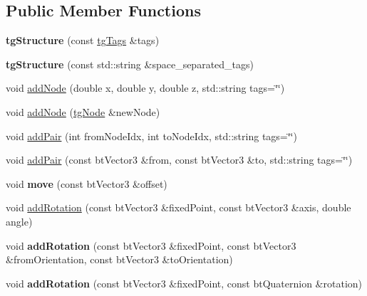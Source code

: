 \subsection*{Public Member Functions}
\begin{DoxyCompactItemize}
\item 
\hypertarget{classtg_structure_a0b858af864193396ab83a2231699c7dd}{{\bfseries tg\-Structure} (const \hyperlink{classtg_tags}{tg\-Tags} \&tags)}\label{classtg_structure_a0b858af864193396ab83a2231699c7dd}

\item 
\hypertarget{classtg_structure_a533f459391d9bc8e1bb772f5195a5458}{{\bfseries tg\-Structure} (const std\-::string \&space\-\_\-separated\-\_\-tags)}\label{classtg_structure_a533f459391d9bc8e1bb772f5195a5458}

\item 
void \hyperlink{classtg_structure_ad534cef2bcb869f03290a447a08507e2}{add\-Node} (double x, double y, double z, std\-::string tags=\char`\"{}\char`\"{})
\item 
void \hyperlink{classtg_structure_a61a46413abd93623470e49af3bff8e74}{add\-Node} (\hyperlink{classtg_node}{tg\-Node} \&new\-Node)
\item 
void \hyperlink{classtg_structure_a79bbef2c45d51cfa9cd8c9c3ca208531}{add\-Pair} (int from\-Node\-Idx, int to\-Node\-Idx, std\-::string tags=\char`\"{}\char`\"{})
\item 
void \hyperlink{classtg_structure_a5f89b7744fdceac6265c20b6cf259b60}{add\-Pair} (const bt\-Vector3 \&from, const bt\-Vector3 \&to, std\-::string tags=\char`\"{}\char`\"{})
\item 
\hypertarget{classtg_structure_a5dedd40946bbdedd0d5a07cbff1f2707}{void {\bfseries move} (const bt\-Vector3 \&offset)}\label{classtg_structure_a5dedd40946bbdedd0d5a07cbff1f2707}

\item 
void \hyperlink{classtg_structure_aaab3aeae354efdb63ab40acdb7bf3553}{add\-Rotation} (const bt\-Vector3 \&fixed\-Point, const bt\-Vector3 \&axis, double angle)
\item 
\hypertarget{classtg_structure_ab309955c8e132bc2b85a0f50cc15aa80}{void {\bfseries add\-Rotation} (const bt\-Vector3 \&fixed\-Point, const bt\-Vector3 \&from\-Orientation, const bt\-Vector3 \&to\-Orientation)}\label{classtg_structure_ab309955c8e132bc2b85a0f50cc15aa80}

\item 
\hypertarget{classtg_structure_a7fad44388ab87b07b9e6d42076644a49}{void {\bfseries add\-Rotation} (const bt\-Vector3 \&fixed\-Point, const bt\-Quaternion \&rotation)}\label{classtg_structure_a7fad44388ab87b07b9e6d42076644a49}


\end{DoxyCompactItemize}
